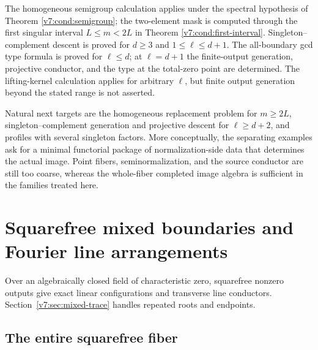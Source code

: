 \documentclass[10pt,fleqn]{article}
\numberwithin{equation}{section}
\begin{document}
The homogeneous semigroup calculation applies under the spectral hypothesis
of Theorem \ref{v7:cond:semigroup}; the two-element mask is computed
through the first singular interval \(L\le m<2L\) in Theorem
\ref{v7:cond:first-interval}.  Singleton--complement descent is proved
for \(d\ge3\) and \(1\le\ell\le d+1\).  The all-boundary gcd type formula is
proved for \(\ell\le d\); at \(\ell=d+1\) the finite-output generation,
projective conductor, and the type at the total-zero point are determined.
The lifting-kernel calculation applies for arbitrary \(\ell\), but finite
output generation beyond the stated range is not asserted.

Natural next targets are the homogeneous replacement problem for \(m\ge2L\),
singleton--complement generation and projective descent for \(\ell\ge d+2\),
and profiles with several singleton factors.  More conceptually, the
separating examples ask for a minimal functorial package of normalization-side
data that determines the actual image.  Point fibers, seminormalization, and
the source conductor are still too coarse, whereas the whole-fiber completed
image algebra is sufficient in the families treated here.
\appendix
\section{Squarefree mixed boundaries and Fourier line arrangements}
\label{v7:app:linear}

Over an algebraically closed field of characteristic zero, squarefree
nonzero outputs give exact linear configurations and transverse line
conductors.  Section~\ref{v7:sec:mixed-trace} handles repeated roots
and endpoints.

\subsection{The entire squarefree fiber}
\label{r27:linear:fiber}
\end{document}
